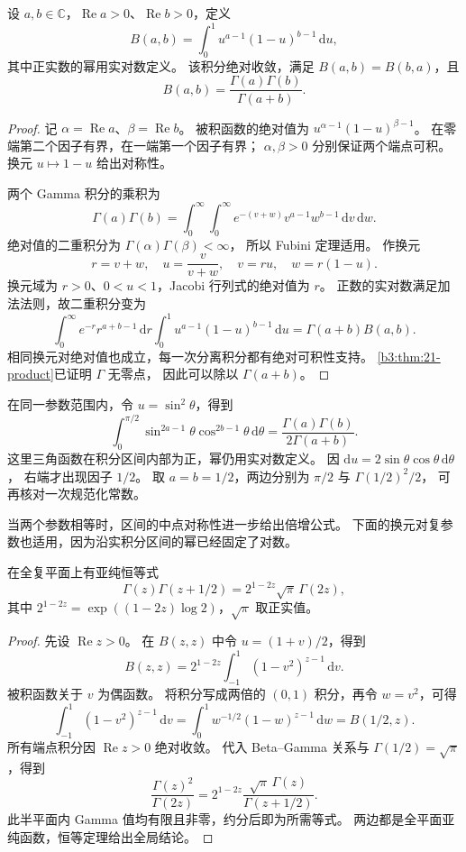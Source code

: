 \begin{proposition}[Beta 积分]\label{b3:prop:21-beta-integral}
设 \(a,b\in\mathbb C\)，\(\operatorname{Re}a>0\)、\(\operatorname{Re}b>0\)，定义
\[
 B(a,b)=\int_0^1u^{a-1}(1-u)^{b-1}\,\mathrm du,
\]
其中正实数的幂用实对数定义。
该积分绝对收敛，满足 \(B(a,b)=B(b,a)\)，且
\[
 B(a,b)=\frac{\Gamma(a)\Gamma(b)}{\Gamma(a+b)}.
\]
\end{proposition}
\begin{proof}
记 \(\alpha=\operatorname{Re}a\)、\(\beta=\operatorname{Re}b\)。
被积函数的绝对值为 \(u^{\alpha-1}(1-u)^{\beta-1}\)。
在零端第二个因子有界，在一端第一个因子有界；
\(\alpha,\beta>0\) 分别保证两个端点可积。
换元 \(u\mapsto1-u\) 给出对称性。

两个 Gamma 积分的乘积为
\[
 \Gamma(a)\Gamma(b)
 =\int_0^\infty\!\int_0^\infty
 e^{-(v+w)}v^{a-1}w^{b-1}\,\mathrm dv\,\mathrm dw.
\]
绝对值的二重积分为 \(\Gamma(\alpha)\Gamma(\beta)<\infty\)，
所以 Fubini 定理适用。
作换元
\[
 r=v+w,\quad u=\frac{v}{v+w},\quad
 v=ru,\quad w=r(1-u).
\]
换元域为 \(r>0\)、\(0<u<1\)，Jacobi 行列式的绝对值为 \(r\)。
正数的实对数满足加法法则，故二重积分变为
\[
 \int_0^\infty e^{-r}r^{a+b-1}\,\mathrm dr
 \int_0^1u^{a-1}(1-u)^{b-1}\,\mathrm du
 =\Gamma(a+b)B(a,b).
\]
相同换元对绝对值也成立，每一次分离积分都有绝对可积性支持。
\cref{b3:thm:21-product}已证明 \(\Gamma\) 无零点，
因此可以除以 \(\Gamma(a+b)\)。
\end{proof}

在同一参数范围内，令 \(u=\sin^2\theta\)，得到
\[
 \int_0^{\pi/2}\sin^{2a-1}\theta\cos^{2b-1}\theta\,\mathrm d\theta
 =\frac{\Gamma(a)\Gamma(b)}{2\Gamma(a+b)}.
\]
这里三角函数在积分区间内部为正，幂仍用实对数定义。
因 \(\mathrm du=2\sin\theta\cos\theta\,\mathrm d\theta\)，
右端才出现因子 \(1/2\)。
取 \(a=b=1/2\)，两边分别为 \(\pi/2\) 与 \(\Gamma(1/2)^2/2\)，
可再核对一次规范化常数。

\ProseParagraphBreak
当两个参数相等时，区间的中点对称性进一步给出倍增公式。
下面的换元对复参数也适用，因为沿实积分区间的幂已经固定了对数。

\begin{theorem}\label{b3:thm:21-duplication}
在全复平面上有亚纯恒等式
\[
 \Gamma(z)\Gamma(z+1/2)
 =2^{1-2z}\sqrt\pi\,\Gamma(2z),
\]
其中 \(2^{1-2z}=\exp((1-2z)\log2)\)，\(\sqrt\pi\) 取正实值。
\end{theorem}
\begin{proof}
先设 \(\operatorname{Re}z>0\)。
在 \(B(z,z)\) 中令 \(u=(1+v)/2\)，得到
\[
 B(z,z)=2^{1-2z}\int_{-1}^1(1-v^2)^{z-1}\,\mathrm dv.
\]
被积函数关于 \(v\) 为偶函数。
将积分写成两倍的 \((0,1)\) 积分，再令 \(w=v^2\)，可得
\[
 \int_{-1}^1(1-v^2)^{z-1}\,\mathrm dv
 =\int_0^1w^{-1/2}(1-w)^{z-1}\,\mathrm dw
 =B(1/2,z).
\]
所有端点积分因 \(\operatorname{Re}z>0\) 绝对收敛。
代入 Beta--Gamma 关系与 \(\Gamma(1/2)=\sqrt\pi\)，得到
\[
 \frac{\Gamma(z)^2}{\Gamma(2z)}
 =2^{1-2z}\frac{\sqrt\pi\,\Gamma(z)}{\Gamma(z+1/2)}.
\]
此半平面内 Gamma 值均有限且非零，约分后即为所需等式。
两边都是全平面亚纯函数，恒等定理给出全局结论。
\end{proof}

